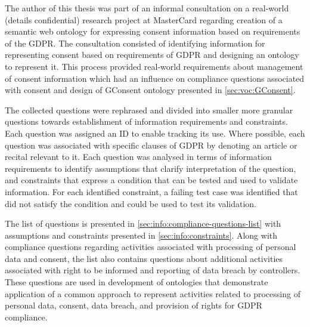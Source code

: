 The author of this thesis was part of an informal consultation on a real-world (details confidential) research project at MasterCard regarding creation of a semantic web ontology for expressing consent information based on requirements of the GDPR.
The consultation consisted of identifying information for representing consent based on requirements of GDPR and designing an ontology to represent it. 
This process provided real-world requirements about management of consent information which had an influence on compliance questions associated with consent and design of GConsent ontology presented in \autoref{sec:voc:GConsent}.

The collected questions were rephrased and divided into smaller more granular questions towards establishment of information requirements and constraints. 
Each question was assigned an ID to enable tracking its use.
Where possible, each question was associated with specific clauses of GDPR by denoting an article or recital relevant to it. Each question was analysed in terms of information requirements to identify assumptions that clarify interpretation of the question, and constraints that express a condition that can be tested and used to validate information. For each identified constraint, a failing test case was identified that did not satisfy the condition and could be used to test its validation.

The list of questions is presented in \autoref{sec:info:compliance-questions-list} with assumptions and constraints presented in \autoref{sec:info:constraints}. Along with compliance questions regarding activities associated with processing of personal data and consent, the list also contains questions about additional activities associated with right to be informed and reporting of data breach by controllers. These questions are used in development of ontologies that demonstrate application of a common approach to represent activities related to processing of personal data, consent, data breach, and provision of rights for GDPR compliance. 

